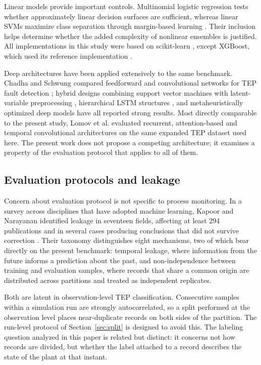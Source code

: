 \documentclass[12pt,a4paper]{article}
\begin{document}
Linear models provide important controls. Multinomial logistic regression tests
whether approximately linear decision surfaces are sufficient, whereas linear
SVMs maximize class separation through margin-based learning
\cite{cortes1995svm}. Their inclusion helps determine whether the added
complexity of nonlinear ensembles is justified. All implementations in this
study were based on scikit-learn \cite{pedregosa2011sklearn}, except XGBoost,
which used its reference implementation \cite{chen2016xgboost}.

Deep architectures have been applied extensively to the same benchmark. Chadha
and Schwung compared feedforward and convolutional networks for TEP fault
detection \cite{chadha2017comparison}; hybrid designs combining support vector
machines with latent-variable preprocessing \cite{gao2016svm}, hierarchical
LSTM structures \cite{agarwal2022lstm}, and metaheuristically optimized deep
models \cite{anitha2023imvoa} have all reported strong results. Most directly
comparable to the present study, Lomov et al. \cite{lomov2021temporal}
evaluated recurrent, attention-based and temporal convolutional architectures
on the same expanded TEP dataset used here. The present work does not propose
a competing architecture; it examines a property of the evaluation protocol
that applies to all of them.

\subsection{Evaluation protocols and leakage}

Concern about evaluation protocol is not specific to process monitoring. In a
survey across disciplines that have adopted machine learning, Kapoor and
Narayanan identified leakage in seventeen fields, affecting at least 294
publications and in several cases producing conclusions that did not survive
correction \cite{kapoor2023leakage}. Their taxonomy distinguishes eight
mechanisms, two of which bear directly on the present benchmark: temporal
leakage, where information from the future informs a prediction about the past,
and non-independence between training and evaluation samples, where records
that share a common origin are distributed across partitions and treated as
independent replicates.

Both are latent in observation-level TEP classification. Consecutive samples
within a simulation run are strongly autocorrelated, so a split performed at
the observation level places near-duplicate records on both sides of the
partition. The run-level protocol of Section~\ref{sec:split} is designed to
avoid this. The labeling question analyzed in this paper is related but
distinct: it concerns not how records are divided, but whether the label
attached to a record describes the state of the plant at that instant.
\end{document}
